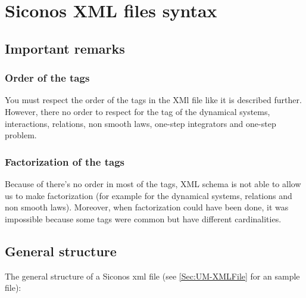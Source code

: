 \section{Siconos XML files syntax}


\subsection{Important remarks}
\subsubsection{Order of the tags}
You must respect the order of the tags in the XMl file like it is described further. However, there no
order to respect for the tag of the dynamical systems, interactions, relations, non smooth laws, one-step
integrators and one-step problem.

\subsubsection{Factorization of the tags}
Because of there's no order in most of the tags, XML schema is not able to allow us to make
factorization (for example for the dynamical systems, relations and non smooth laws). Moreover, when
factorization could have been done, it was impossible because some tags were common but have different
cardinalities.


\subsection{General structure}

The general structure of a Siconos \ac{xml} file (see \ref{Sec:UM-XMLFile} for an sample file):\\


